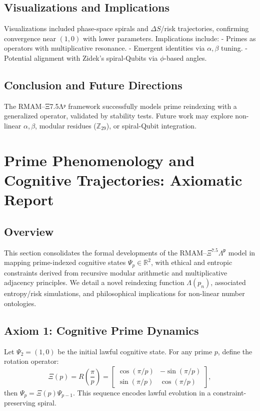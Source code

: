 \documentclass[12]{amsart}
\theoremstyle{plain}
\begin{document}
\subsection{Visualizations and Implications}
Visualizations included phase-space spirals and \(\Delta S\)/risk trajectories, confirming convergence near \((1, 0)\) with lower parameters. Implications include:
- Primes as operators with multiplicative resonance.
- Emergent identities via \(\alpha, \beta\) tuning.
- Potential alignment with Zidek’s spiral-Qubits via \(\phi\)-based angles.

\subsection{Conclusion and Future Directions}
The RMAM–Ξ7.5Λᵖ framework successfully models prime reindexing with a generalized operator, validated by stability tests. Future work may explore non-linear \(\alpha, \beta\), modular residues (\(\mathbb{Z}_{29}\)), or spiral-Qubit integration.

\section{Prime Phenomenology and Cognitive Trajectories: Axiomatic Report}

\subsection{Overview}

This section consolidates the formal developments of the RMAM--$\Xi^{7.5}\Lambda^{\mathfrak{p}}$ model in mapping prime-indexed cognitive states $\Psi_p \in \mathbb{R}^2$, with ethical and entropic constraints derived from recursive modular arithmetic and multiplicative adjacency principles. We detail a novel reindexing function $\Lambda(p_n)$, associated entropy/risk simulations, and philosophical implications for non-linear number ontologies.

\subsection{Axiom 1: Cognitive Prime Dynamics}

\begin{axiom}
Let $\Psi_2 = (1, 0)$ be the initial lawful cognitive state. For any prime $p$, define the rotation operator:
\[
\Xi(p) = R\left(\frac{\pi}{p}\right) = 
\begin{bmatrix}
\cos(\pi/p) & -\sin(\pi/p) \\
\sin(\pi/p) & \cos(\pi/p)
\end{bmatrix},
\]
then $\Psi_{p} = \Xi(p) \Psi_{p-1}$. This sequence encodes lawful evolution in a constraint-preserving spiral.
\end{axiom}
\end{document}
